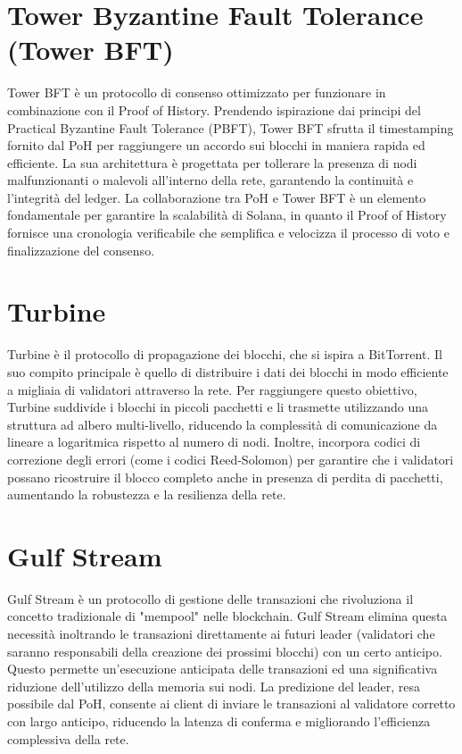 \documentclass[a4paper,12pt]{report}
\begin{document}
	\section{Tower Byzantine Fault Tolerance (Tower BFT)}
	Tower BFT è un protocollo di consenso ottimizzato per funzionare in combinazione con il Proof of History. Prendendo ispirazione dai principi del Practical Byzantine Fault Tolerance (PBFT), Tower BFT sfrutta il timestamping fornito dal PoH per raggiungere un accordo sui blocchi in maniera rapida ed efficiente. La sua architettura è progettata per tollerare la presenza di nodi malfunzionanti o malevoli all'interno della rete, garantendo la continuità e l'integrità del ledger. La collaborazione tra PoH e Tower BFT è un elemento fondamentale per garantire la scalabilità di Solana, in quanto il Proof of History fornisce una cronologia verificabile che semplifica e velocizza il processo di voto e finalizzazione del consenso.
	
	\section{Turbine}
	Turbine è il protocollo di propagazione dei blocchi, che si ispira a BitTorrent. Il suo compito principale è quello di distribuire i dati dei blocchi in modo efficiente a migliaia di validatori attraverso la rete. Per raggiungere questo obiettivo, Turbine suddivide i blocchi in piccoli pacchetti e li trasmette utilizzando una struttura ad albero multi-livello, riducendo la complessità di comunicazione da lineare a logaritmica rispetto al numero di nodi. Inoltre, incorpora codici di correzione degli errori (come i codici Reed-Solomon) per garantire che i validatori possano ricostruire il blocco completo anche in presenza di perdita di pacchetti, aumentando la robustezza e la resilienza della rete.
	
	\section{Gulf Stream}
	Gulf Stream è un protocollo di gestione delle transazioni che rivoluziona il concetto tradizionale di "mempool" nelle blockchain. Gulf Stream elimina questa necessità inoltrando le transazioni direttamente ai futuri leader (validatori che saranno responsabili della creazione dei prossimi blocchi) con un certo anticipo. Questo permette un'esecuzione anticipata delle transazioni ed una significativa riduzione dell'utilizzo della memoria sui nodi. La predizione del leader, resa possibile dal PoH, consente ai client di inviare le transazioni al validatore corretto con largo anticipo, riducendo la latenza di conferma e migliorando l'efficienza complessiva della rete.
	
\end{document}
